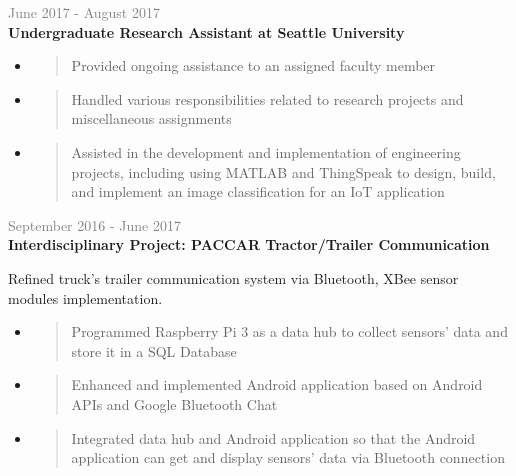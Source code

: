 \documentclass[letterpage]{article}
\begin{document}
\begin{minipage}[t]{0.61\linewidth}
\vspace{7px}
\textcolor{gray}{June 2017 - August 2017}
\quad 
\\
\textbf{\textsf{Undergraduate Research Assistant at Seattle University}}\\
\raggedright
\begin{itemize}[leftmargin=*,labelindent=1mm,labelsep=0mm]
\item
  \begin{quote}
  \raggedright
  Provided ongoing assistance to an assigned faculty member
  \end{quote}
\item
  \begin{quote}
  \raggedright
  Handled various responsibilities related to research projects
and miscellaneous assignments
  \end{quote}
\item 
  \begin{quote}
    \raggedright
    Assisted in the development and implementation of
    engineering projects, including using MATLAB and ThingSpeak to design, build, and implement an image classification for an IoT application
  \end{quote}
\end{itemize}

\vspace{7px}
\textcolor{gray}{September 2016 - June 2017}
\quad 
\\
\textbf{\textsf{Interdisciplinary Project:
PACCAR Tractor/Trailer Communication}}\\
\raggedright
Refined truck’s trailer communication system via Bluetooth, XBee sensor modules implementation.\\
\begin{itemize}[leftmargin=*,labelindent=1mm,labelsep=0mm]
\item
  \begin{quote}
  \raggedright
  Programmed Raspberry Pi 3 as a data hub to collect sensors' data and store it in a SQL Database
  \end{quote}
\item
  \begin{quote}
  \raggedright
  Enhanced and implemented Android application based on Android APIs and Google Bluetooth Chat
  \end{quote}
\item
  \begin{quote}
  \raggedright
  Integrated data hub and Android application so that the Android application can get and display sensors' data via Bluetooth connection
  \end{quote}
\end{itemize}


\end{minipage}
\end{document}
